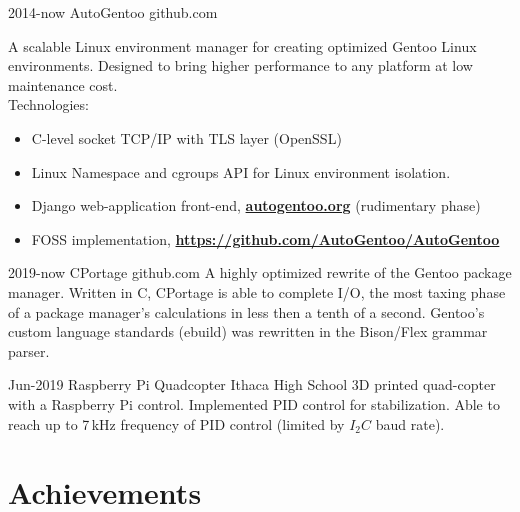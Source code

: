 \documentclass[print]{cv-style}          %
\begin{document}
\begin{entrylist}
\entry
{2014-now}
{AutoGentoo }
{github.com}
{A scalable Linux environment manager for creating optimized Gentoo Linux environments. Designed to bring higher performance to any platform at low maintenance cost. \\
Technologies:
\begin{itemize}%
	\item C-level socket TCP/IP with TLS layer (OpenSSL)
	\item Linux Namespace and cgroups API for Linux environment isolation.
	\item Django web-application front-end, \textbf{\href{https://autogentoo.org}{autogentoo.org}} (rudimentary phase)
	\item FOSS implementation, \textbf{\href{https://github.com/AutoGentoo/AutoGentoo}{https://github.com/AutoGentoo/AutoGentoo}}
\end{itemize}

}

\entry
{2019-now}
{CPortage}
{github.com}
{A highly optimized rewrite of the Gentoo package manager. Written in C, CPortage is able to complete I/O, the most taxing phase of a package manager's calculations in less then a tenth of a second. Gentoo's custom language standards (ebuild) was rewritten in the Bison/Flex grammar parser.}

\entry
{Jun-2019}
{Raspberry Pi Quadcopter }
{Ithaca High School}
{3D printed quad-copter with a Raspberry Pi control. Implemented PID control for stabilization. Able to reach up to 7\,kHz frequency of PID control (limited by $I_2C$ baud rate). }
{\vspace{-0.3cm}}
\end{entrylist}

\pagebreak
\section{Achievements}
\end{document}
